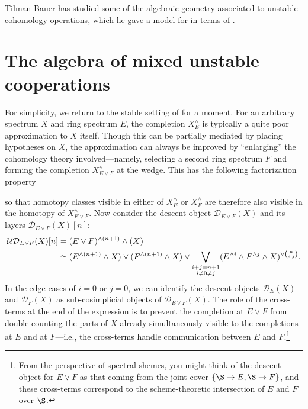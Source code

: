 \begin{remark}
Tilman Bauer has studied some of the algebraic geometry associated to unstable cohomology operations, which he gave a model for in terms of .
\end{remark}










\section{The algebra of mixed unstable cooperations}\label{UnstableAlgebraicModelSection}

For simplicity, we return to the stable setting of  for a moment.  For an arbitrary spectrum $X$ and ring spectrum $E$, the completion $X^\wedge_E$ is typically a quite poor approximation to $X$ itself.  Though this can be partially mediated by placing hypotheses on $X$, the approximation can always be improved by ``enlarging'' the cohomology theory involved---namely, selecting a second ring spectrum $F$ and forming the completion $X^\wedge_{E \vee F}$ at the wedge.  This has the following factorization property
\begin{center}
\end{center}
so that homotopy classes visible in either of $X^\wedge_E$ or $X^\wedge_F$ are therefore also visible in the homotopy of $X^\wedge_{E \vee F}$.  Now consider the descent object $\mathcal D_{E \vee F}(X)$ and its layers $\mathcal D_{E \vee F}(X)[n]$:
\begin{align*}
\mathcal{UD}_{E \vee F}(X)[n] & = (E \vee F)^{\wedge (n+1)} \wedge (X) \\
& \simeq (E^{\wedge (n+1)} \wedge X) \vee (F^{\wedge (n+1)} \wedge X) \vee \bigvee_{\substack{i+j=n+1 \\ i \ne 0 \ne j}} (E^{\wedge i} \wedge F^{\wedge j} \wedge X)^{\vee \binom{n}{i,j}}.
\end{align*}
In the edge cases of $i = 0$ or $j = 0$, we can identify the descent objects $\mathcal D_E(X)$ and $\mathcal D_F(X)$ as sub-cosimplicial objects of $\mathcal D_{E \vee F}(X)$.  The role of the cross-terms at the end of the expression is to prevent the completion at $E \vee F$ from double-counting the parts of $X$ already simultaneously visible to the completions at $E$ and at $F$---i.e., the cross-terms handle communication between $E$ and $F$.\footnote{From the perspective of spectral shemes, you might think of the descent object for $E \vee F$ as that coming from the joint cover $\{\S \to E, \S \to F\}$, and these cross-terms correspond to the scheme-theoretic intersection of $E$ and $F$ over $\S$.}


